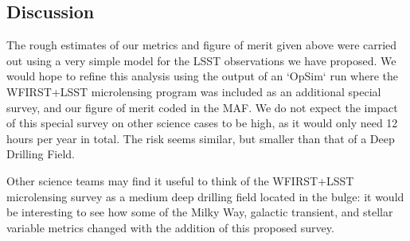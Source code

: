 \subsection{Discussion}
\label{sec:\secname:discussion}

The rough estimates of our metrics and figure of merit given above were
carried out using a very simple model for the LSST observations we
have proposed. We would hope to refine this analysis using the output
of an `OpSim` run where the WFIRST+LSST microlensing program was included
as an additional special survey, and our figure of merit coded in the
MAF. We do not expect the impact of this special survey on other science cases
to be high, as it would only need 12 hours per year in total. The risk
seems similar, but smaller than that of a Deep Drilling Field.

Other science teams may find it useful to think of the WFIRST+LSST microlensing
survey as a medium deep drilling field located in the bulge: it would be interesting
to see how some of the Milky Way, galactic transient, and  stellar variable
metrics changed with the addition of this proposed survey.



\navigationbar

